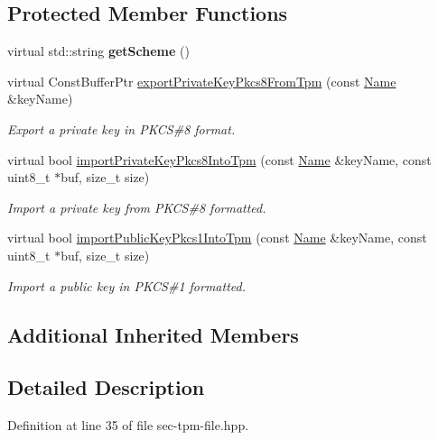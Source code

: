 \subsection*{Protected Member Functions}
\begin{DoxyCompactItemize}
\item 
virtual std\+::string {\bfseries get\+Scheme} ()\hypertarget{classndn_1_1SecTpmFile_aa2ee481fde44b2ac9e66e9a9370027c2}{}\label{classndn_1_1SecTpmFile_aa2ee481fde44b2ac9e66e9a9370027c2}

\item 
virtual Const\+Buffer\+Ptr \hyperlink{classndn_1_1SecTpmFile_ae0240a307c23799226fa3dea2eeed25a}{export\+Private\+Key\+Pkcs8\+From\+Tpm} (const \hyperlink{classndn_1_1Name}{Name} \&key\+Name)
\begin{DoxyCompactList}\small\item\em Export a private key in P\+K\+CS\#8 format. \end{DoxyCompactList}\item 
virtual bool \hyperlink{classndn_1_1SecTpmFile_adfe45af85cfca5ed88b49d5b3001e16b}{import\+Private\+Key\+Pkcs8\+Into\+Tpm} (const \hyperlink{classndn_1_1Name}{Name} \&key\+Name, const uint8\+\_\+t $\ast$buf, size\+\_\+t size)
\begin{DoxyCompactList}\small\item\em Import a private key from P\+K\+CS\#8 formatted. \end{DoxyCompactList}\item 
virtual bool \hyperlink{classndn_1_1SecTpmFile_a0a4a8bbefb3dfa59af3a862819156379}{import\+Public\+Key\+Pkcs1\+Into\+Tpm} (const \hyperlink{classndn_1_1Name}{Name} \&key\+Name, const uint8\+\_\+t $\ast$buf, size\+\_\+t size)
\begin{DoxyCompactList}\small\item\em Import a public key in P\+K\+CS\#1 formatted. \end{DoxyCompactList}\end{DoxyCompactItemize}
\subsection*{Additional Inherited Members}


\subsection{Detailed Description}


Definition at line 35 of file sec-\/tpm-\/file.\+hpp.



